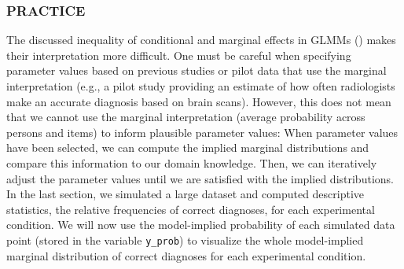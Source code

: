 \documentclass[
  man,
  floatsintext,
  longtable,
  a4paper,
  nolmodern,
  notxfonts,
  notimes,
  colorlinks=true,linkcolor=blue,citecolor=blue,urlcolor=blue]{apa7}
\begin{document}
\subsubsection{PRACTICE}\label{practice-4}

The discussed inequality of conditional and marginal effects in GLMMs
() makes their interpretation more difficult. One must be careful
when specifying parameter values based on previous studies or pilot data
that use the marginal interpretation (e.g., a pilot study providing an
estimate of how often radiologists make an accurate diagnosis based on
brain scans). However, this does not mean that we cannot use the
marginal interpretation (average probability across persons and items)
to inform plausible parameter values: When parameter values have been
selected, we can compute the implied marginal distributions and compare
this information to our domain knowledge. Then, we can iteratively
adjust the parameter values until we are satisfied with the implied
distributions. In the last section, we simulated a large dataset and
computed descriptive statistics, the relative frequencies of correct
diagnoses, for each experimental condition. We will now use the
model-implied probability of each simulated data point (stored in the
variable \texttt{y\_prob}) to visualize the whole model-implied marginal
distribution of correct diagnoses for each experimental condition.
\end{document}
